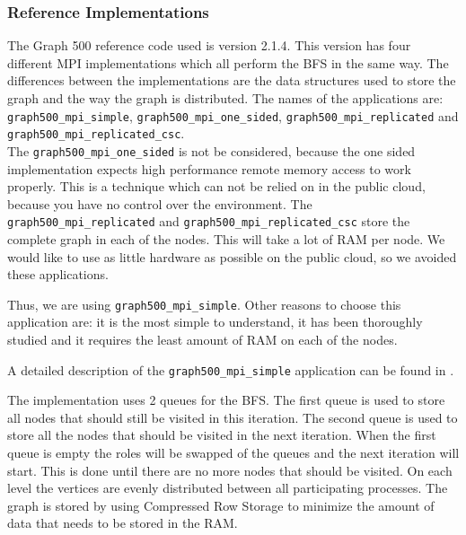 \subsubsection{Reference Implementations}

The Graph 500 reference code\cite{graph500-code} used is version 2.1.4. This version has four different MPI implementations which all perform the BFS in the same way. The differences between the implementations are the data structures used to store the graph and the way the graph is distributed. The names of the applications are: \texttt{graph500\_mpi\_simple}, \texttt{graph500\_mpi\_one\_sided}, \texttt{graph500\_mpi\_replicated} and \texttt{graph500\_mpi\_replicated\_csc}.
\\ 
The \texttt{graph500\_mpi\_one\_sided} is not be considered, because the one sided implementation expects high performance remote memory access to work properly. This is a technique which can not be relied on in the public cloud, because you have no control over the environment. The \texttt{graph500\_mpi\_replicated} and \texttt{graph500\_mpi\_replicated\_csc} store the complete graph in each of the nodes. This will take a lot of RAM per node. We would like to use as little hardware as possible on the public cloud, so we avoided these applications.

Thus, we are using \texttt{graph500\_mpi\_simple}. Other reasons to choose this application are: it is the most simple to understand, it has been thoroughly studied and it requires the least amount of RAM on each of the nodes. 

A detailed description of the \texttt{graph500\_mpi\_simple} application can be found in \cite{suzumura2011performance}.

The implementation uses 2 queues for the BFS. The first queue is used to store all nodes that should still be visited in this iteration. The second queue is used to store all the nodes that should be visited in the next iteration. When the first queue is empty the roles will be swapped of the queues and the next iteration will start. This is done until there are no more nodes that should be visited. On each level the vertices are evenly distributed between all participating processes. The graph is stored by using Compressed Row Storage\cite{crs} to minimize the amount of data that needs to be stored in the RAM.

